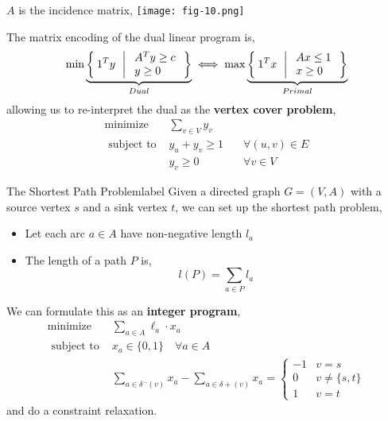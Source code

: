 	\begin{marginfigure}
		$A$ is the incidence matrix, 
		\texttt{[image: fig-10.png]}
	\end{marginfigure}

	\begin{rmk}
		The matrix encoding of the dual linear program is,
		\[
		   \min \underbrace{\Set{ 1^Ty \ | \begin{array}{l}
		    A^T y \geq c \\
		    y \geq 0
		  \end{array}}}_{Dual}
			\iff
			\max \underbrace{\Set{ 1^Tx \ | \begin{array}{l}
		    Ax \leq 1 \\
		    x \geq 0
		  \end{array}}}_{Primal}
		\]
		\noindent allowing us to re-interpret the dual as the \textbf{vertex cover problem},
		\[
		\begin{array}{lll}
				\operatorname{minimize} & \sum_{v \in V} y_v & \\
				\text{ subject to } & y_u + y_v \geq 1 & \quad \forall (u,v) \in E \\
				& y_v \geq 0 & \quad \forall v \in V
			\end{array}
		\]
	\end{rmk}

	\begin{ex}{The Shortest Path Problem}{label}
		Given a directed graph $G = (V, A)$ with a source vertex $s$ and a sink vertex $t$, we can set up the shortest path problem,
		\begin{itemize}
			\item Let each arc $a \in A$ have non-negative length $l_a$
			\item The length of a path $P$ is,
			\[l(P) = \sum_{a \in P}l_a\]
		\end{itemize}
		We can formulate this as an \textbf{integer program},
		\[
		\begin{array}{ll}
				\operatorname{minimize} & \sum_{a \in A} \ell_{a} \cdot x_{a} \\
				\text{ subject to } & x_{a} \in\{0,1\} \quad \forall a \in A \\
				& \sum_{a \in \delta^{-}(v)} x_{a}-\sum_{a \in \delta+(v)} x_{a}= \begin{cases}-1 & v=s \\
												0 & v \neq\{s, t\} \\
												1 & v=t\end{cases}
			\end{array}
		\]
		\noindent and do a constraint relaxation.
	\end{ex}

